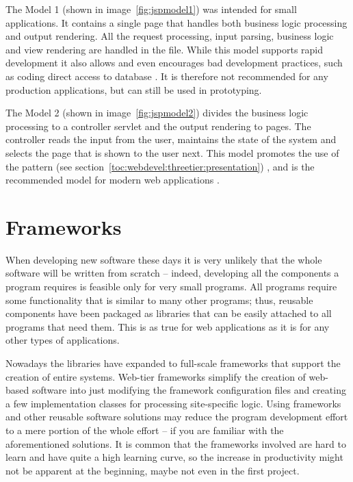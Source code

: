 The  Model 1 (shown in image~\ref{fig:jspmodel1}) was 
intended for small applications. It contains a single  
page that handles both business logic processing and output rendering. 
All the request processing, input parsing, business logic and view 
rendering are handled in the  file. While this model 
supports rapid development it also allows and even encourages bad 
development practices, such as coding direct access to database 
\citep{advancedwebdevel}. It is therefore not recommended for any 
production applications, but can still be used in prototyping.

The  Model 2 (shown in image~\ref{fig:jspmodel2}) divides 
the business logic processing to a controller servlet and the output 
rendering to  pages. The controller reads the input from 
the user, maintains the state of the system and selects the 
 page that is shown to the user next. This model promotes 
the use of the  pattern (see 
section~\ref{toc:webdevel:threetier:presentation}) 
\citep{jsppractices}, and is the recommended model for modern web 
applications \citep{parviainen}.



\section{Frameworks}
\label{toc:webdevel:frameworks}

When developing new software these days it is very unlikely that the 
whole software will be written from scratch \citep{frameworkselection} 
-- indeed, developing all the components a program requires is 
feasible only for very small programs. All programs require some 
functionality that is similar to many other programs; thus, reusable 
components have been packaged as libraries that can be easily attached 
to all programs that need them. This is as true for web applications 
as it is for any other types of applications.

Nowadays the libraries have expanded to full-scale frameworks that 
support the creation of entire systems. Web-tier frameworks simplify 
the creation of web-based software into just modifying the framework 
configuration files and creating a few implementation classes for 
processing site-specific logic. Using frameworks and other reusable 
software solutions may reduce the program development effort to a mere 
portion of the whole effort -- if you are familiar with the 
aforementioned solutions. It is common that the frameworks involved 
are hard to learn and have quite a high learning curve, so the 
increase in productivity might not be apparent at the beginning, maybe 
not even in the first project. \citep{fweqcomppat}

